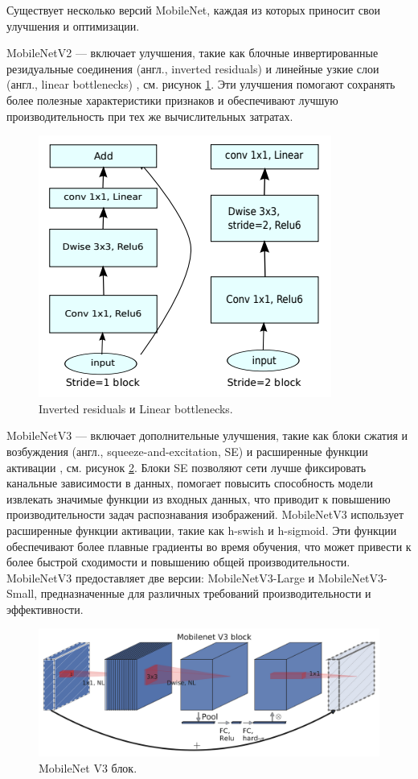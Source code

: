 \documentclass[a4paper,12pt]{extarticle}
\begin{document}
Существует несколько версий MobileNet, каждая из которых приносит свои улучшения и оптимизации.

MobileNetV2 — включает улучшения, такие как блочные инвертированные резидуальные соединения (англ., inverted residuals) и линейные узкие слои (англ., linear bottlenecks) \cite{mobilenetv2}, см. рисунок  \ref{fig:mobilenetv2}. Эти улучшения помогают сохранять более полезные характеристики признаков и обеспечивают лучшую производительность при тех же вычислительных затратах.

\begin{figure}[ht]
	\centering
	\includegraphics[scale=0.8]{mobilenetv2.png}
	\caption{Inverted residuals и Linear bottlenecks.}
	\label{fig:mobilenetv2}
\end{figure}

MobileNetV3 — включает дополнительные улучшения, такие как блоки сжатия и возбуждения (англ., squeeze-and-excitation, SE) и расширенные функции активации \cite{mobilenetv3},  см. рисунок  \ref{fig:mobilenetv3}. Блоки SE позволяют сети лучше фиксировать канальные зависимости в данных, помогает повысить способность модели извлекать значимые функции из входных данных, что приводит к повышению производительности задач распознавания изображений. MobileNetV3 использует расширенные функции активации, такие как h-swish и h-sigmoid. Эти функции обеспечивают более плавные градиенты во время обучения, что может привести к более быстрой сходимости и повышению общей производительности. MobileNetV3 предоставляет две версии: MobileNetV3-Large и MobileNetV3-Small, предназначенные для различных требований производительности и эффективности.

\begin{figure}[ht]
	\centering
	\includegraphics[scale=0.2]{mobilenet-v3-block.png}
	\caption{MobileNet V3 блок.}
	\label{fig:mobilenetv3}
\end{figure}
\end{document}
